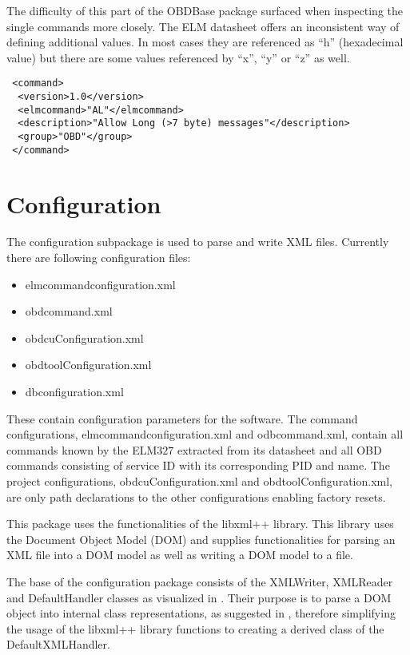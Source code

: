 The difficulty of this part of the OBDBase package surfaced when inspecting the single commands more closely. The ELM datasheet offers 
an inconsistent way of defining additional values. In most cases they are referenced as ``h'' (hexadecimal value) but there are some values 
referenced by ``x'', ``y'' or ``z'' as well.

\begin{verbatim}
 <command>
  <version>1.0</version>
  <elmcommand>"AL"</elmcommand>
  <description>"Allow Long (>7 byte) messages"</description> 
  <group>"OBD"</group>
 </command>
\end{verbatim}

\section{Configuration}
\label{sec:configuration}
The configuration subpackage is used to parse and write XML files. Currently there are following configuration files: 

\begin{itemize}
 \item elmcommandconfiguration.xml
 \item obdcommand.xml
 \item obdcuConfiguration.xml
 \item obdtoolConfiguration.xml
 \item dbconfiguration.xml
\end{itemize}

These contain configuration parameters for the software. The command configurations, elmcommandconfiguration.xml and odbcommand.xml, contain all 
commands known by the ELM$327$ extracted from its datasheet and all OBD commands consisting of service ID with its corresponding PID and name. 
The project configurations, obdcuConfiguration.xml and obdtoolConfiguration.xml, are only path declarations to the other configurations enabling 
factory resets.

This package uses the functionalities of the libxml++ \cite{XMLLIB} library. This library uses the Document Object Model (DOM) and supplies functionalities 
for parsing an XML file into a DOM model as well as writing a DOM model to a file. 

The base of the configuration package consists of the XMLWriter, XMLReader and DefaultHandler classes as visualized in . 
Their purpose is to parse a DOM object into internal class representations, as suggested in , therefore simplifying the usage of the 
libxml++ library functions to creating a derived class of the DefaultXMLHandler. 

